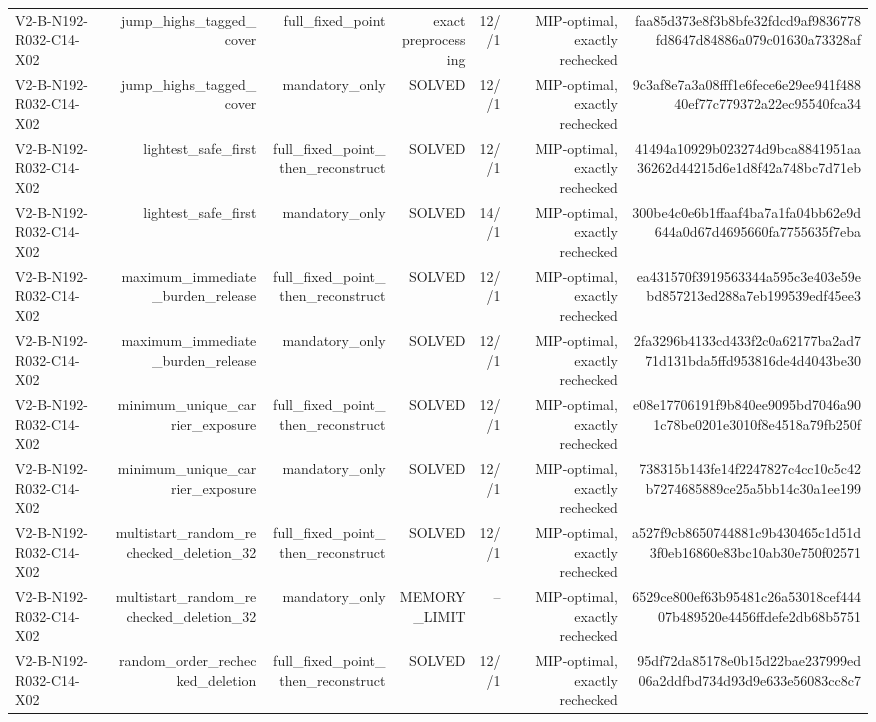 {\begin{longtable}{lrrrrrr}
V2-B-N192-R032-C14-X02 & jump\_highs\_tagged\_cover & full\_fixed\_point & exact preprocessing & 12//1 & MIP-optimal, exactly rechecked & faa85d373e8f3b8bfe32fdcd9af9836778fd8647d84886a079c01630a73328af \\
V2-B-N192-R032-C14-X02 & jump\_highs\_tagged\_cover & mandatory\_only & SOLVED & 12//1 & MIP-optimal, exactly rechecked & 9c3af8e7a3a08fff1e6fece6e29ee941f48840ef77c779372a22ec95540fca34 \\
V2-B-N192-R032-C14-X02 & lightest\_safe\_first & full\_fixed\_point\_then\_reconstruct & SOLVED & 12//1 & MIP-optimal, exactly rechecked & 41494a10929b023274d9bca8841951aa36262d44215d6e1d8f42a748bc7d71eb \\
V2-B-N192-R032-C14-X02 & lightest\_safe\_first & mandatory\_only & SOLVED & 14//1 & MIP-optimal, exactly rechecked & 300be4c0e6b1ffaaf4ba7a1fa04bb62e9d644a0d67d4695660fa7755635f7eba \\
V2-B-N192-R032-C14-X02 & maximum\_immediate\_burden\_release & full\_fixed\_point\_then\_reconstruct & SOLVED & 12//1 & MIP-optimal, exactly rechecked & ea431570f3919563344a595c3e403e59ebd857213ed288a7eb199539edf45ee3 \\
V2-B-N192-R032-C14-X02 & maximum\_immediate\_burden\_release & mandatory\_only & SOLVED & 12//1 & MIP-optimal, exactly rechecked & 2fa3296b4133cd433f2c0a62177ba2ad771d131bda5ffd953816de4d4043be30 \\
V2-B-N192-R032-C14-X02 & minimum\_unique\_carrier\_exposure & full\_fixed\_point\_then\_reconstruct & SOLVED & 12//1 & MIP-optimal, exactly rechecked & e08e17706191f9b840ee9095bd7046a901c78be0201e3010f8e4518a79fb250f \\
V2-B-N192-R032-C14-X02 & minimum\_unique\_carrier\_exposure & mandatory\_only & SOLVED & 12//1 & MIP-optimal, exactly rechecked & 738315b143fe14f2247827c4cc10c5c42b7274685889ce25a5bb14c30a1ee199 \\
V2-B-N192-R032-C14-X02 & multistart\_random\_rechecked\_deletion\_32 & full\_fixed\_point\_then\_reconstruct & SOLVED & 12//1 & MIP-optimal, exactly rechecked & a527f9cb8650744881c9b430465c1d51d3f0eb16860e83bc10ab30e750f02571 \\
V2-B-N192-R032-C14-X02 & multistart\_random\_rechecked\_deletion\_32 & mandatory\_only & MEMORY\_LIMIT & -- & MIP-optimal, exactly rechecked & 6529ce800ef63b95481c26a53018cef44407b489520e4456ffdefe2db68b5751 \\
V2-B-N192-R032-C14-X02 & random\_order\_rechecked\_deletion & full\_fixed\_point\_then\_reconstruct & SOLVED & 12//1 & MIP-optimal, exactly rechecked & 95df72da85178e0b15d22bae237999ed06a2ddfbd734d93d9e633e56083cc8c7 \\

\end{longtable}}
